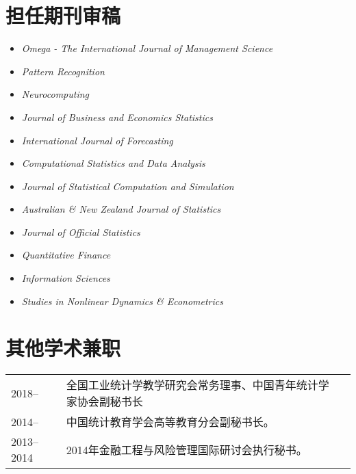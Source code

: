 \documentclass[twoside,a4paper,10.5pt]{article}
\begin{document}
\section*{担任期刊审稿}
\begin{itemize}
\item \emph{Omega - The International Journal of Management Science}
\item \emph{Pattern Recognition}
\item \emph{Neurocomputing}
\item  \emph{Journal of Business and Economics Statistics}
\item  \emph{International Journal of Forecasting}
\item  \emph{Computational Statistics and Data Analysis}
\item  \emph{Journal of Statistical Computation and Simulation}
\item  \emph{Australian \& New Zealand Journal of Statistics}
\item  \emph{Journal of Official Statistics}
\item  \emph{Quantitative Finance}
\item  \emph{Information Sciences}
\item  \emph{Studies in Nonlinear Dynamics \& Econometrics}
\end{itemize}

\section*{其他学术兼职}
\begin{tabular}{l p{} l}
  2018--     & 全国工业统计学教学研究会常务理事、中国青年统计学家协会副秘书长 \\
  2014--     & 中国统计教育学会高等教育分会副秘书长。                         \\
  2013--2014 & 2014年金融工程与风险管理国际研讨会执行秘书。                   \\

\end{tabular}


\end{document}
